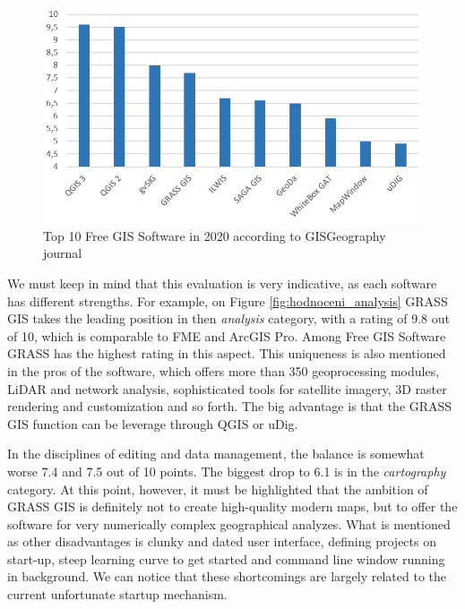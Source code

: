 \documentclass[a4paper,10pt,twoside]{article}
\begin{document}
\begin{figure}[hbt!] 
\begin{center}
\includegraphics[width=13cm]{../pictures/hodnoceni_free.png} 
\caption[Top 10 Free GIS Software in 2020 according to GISGeography journal]{Top 10 Free GIS Software in 2020 according to GISGeography journal}
\label{fig:hodnoceni_free}
\end{center}
\end{figure}

\newpage
\noindent We must keep in mind that this evaluation is very indicative, as each software has different strengths. For example, on Figure \ref{fig:hodnoceni_analysis} GRASS GIS takes the leading position in then \textit{analysis} category, with a rating of 9.8 out of 10, which is comparable to FME and ArcGIS Pro. Among Free GIS Software GRASS has the highest rating in this aspect. This uniqueness is also mentioned in the pros of the software, which offers more than 350 geoprocessing modules, LiDAR and network analysis, sophisticated tools for satellite imagery, 3D raster rendering and customization and so forth.  The big advantage is that the GRASS GIS function can be leverage through QGIS or uDig. 

\newpage
In the disciplines of editing and data management, the balance is somewhat worse 7.4 and 7.5 out of 10 points. The biggest drop to 6.1 is in the \textit{cartography} category. At this point, however, it must be highlighted that the ambition of GRASS GIS is definitely not to create high-quality modern maps, but to offer the software for very numerically complex geographical analyzes. What is mentioned as other disadvantages is clunky and dated user interface, defining projects on start-up, steep learning curve to get started and command line window running in background. We can notice that these shortcomings are largely related to the current unfortunate startup mechanism.
\end{document}

